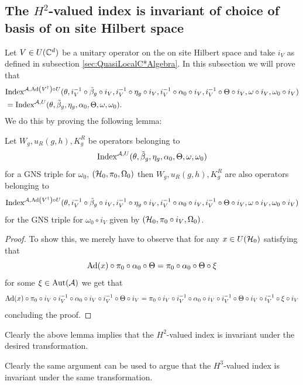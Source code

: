 \documentclass[12pt,a4paper,twoside]{article}
\numberwithin{equation}{section}
\begin{document}
\subsection{The $H^2$-valued index is invariant of choice of basis of on site Hilbert space}\label{sec:the-h2-valued-index-is-invariant-of-choice-of-basis-of-on-site-hilbert-space}
Let $V \in U(\CC^d)$ be a unitary operator on the on site Hilbert space and take $i_V$ as defined in subsection \ref{sec:QuasiLocalC*Algebra}. In this subsection we will prove that
\begin{align}
	&\textrm{Index}^{\AA,\Ad{V^\dagger}\circ U}(\theta,i_V^{-1}\circ\tilde{\beta}_g\circ i_V,i_V^{-1}\circ\eta_g\circ i_V,i_V^{-1}\circ\alpha_0\circ i_V,i_V^{-1}\circ\Theta\circ i_V,\omega\circ i_V,\omega_0\circ i_V)\\
	&=\textrm{Index}^{\AA,U}(\theta,\tilde{\beta}_g,\eta_g,\alpha_0,\Theta,\omega,\omega_0).
\end{align}
We do this by proving the following lemma:
\begin{lemma}
	Let $W_g,u_R(g,h),K^R_g$ be operators belonging to
	\begin{equation}
		\textrm{Index}^{\AA,U}(\theta,\tilde{\beta}_g,\eta_g,\alpha_0,\Theta,\omega,\omega_0)
	\end{equation}
	for a GNS triple for $\omega_0$, $(\HH_0,\pi_0,\Omega_0)$ then $W_g,u_R(g,h),K^R_g$ are also operators belonging to
	\begin{equation}
		\textrm{Index}^{\AA,\Ad{V^\dagger}\circ U}(\theta,i_V^{-1}\circ\tilde{\beta}_g\circ i_V,i_V^{-1}\circ\eta_g\circ i_V,i_V^{-1}\circ\alpha_0\circ i_V,i_V^{-1}\circ\Theta\circ i_V,\omega\circ i_V,\omega_0\circ i_V)
	\end{equation}
	for the GNS triple for $\omega_0\circ i_V$ given by $(\HH_0,\pi_0\circ i_V,\Omega_0)$.
\end{lemma}
\begin{proof}
	To show this, we merely have to observe that for any $x\in U(\HH_0)$ satisfying that
	\begin{equation}
		\Ad{x}\circ\pi_0\circ\alpha_0\circ\Theta =\pi_0\circ\alpha_0\circ\Theta\circ\xi
	\end{equation}
	for some $\xi\in\Aut{\AA}$ we get that
	\begin{equation}
		\Ad{x}\circ\pi_0\circ i_V\circ i_V^{-1}\circ\alpha_0\circ i_V\circ i_V^{-1}\circ\Theta\circ i_V =\pi_0\circ i_V\circ i_V^{-1}\circ\alpha_0\circ i_V\circ i_V^{-1}\circ\Theta\circ i_V\circ i_V^{-1}\circ\xi\circ i_V
	\end{equation}
	concluding the proof.
\end{proof}
Clearly the above lemma implies that the $H^2$-valued index is invariant under the desired transformation.
\begin{remark}\label{rem:OnSiteUnitaryTransformationH3ValuedIndex}
	Clearly the same argument can be used to argue that the $H^3$-valued index is invariant under the same transformation.
\end{remark}
\end{document}
